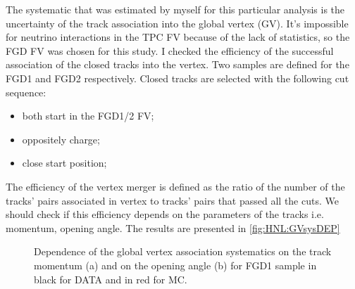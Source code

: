 \documentclass[../main.tex]{subfiles}
\begin{document}
The systematic that was estimated by myself for this particular analysis is the uncertainty of the track association into the global vertex (GV). It's impossible for neutrino interactions in the TPC FV because of the lack of statistics, so the FGD FV was chosen for this study. I checked the efficiency of the successful association of the closed tracks into the vertex. Two samples are defined for the FGD1 and FGD2 respectively. Closed tracks are selected with the following cut sequence:
\begin{itemize}
    \item both start in the FGD1/2 FV;
    \item oppositely charge;
    \item close start position;
\end{itemize}
The efficiency of the vertex merger is defined as the ratio of the number of the tracks' pairs associated in vertex to tracks' pairs that passed all the cuts. We should check if this efficiency depends on the parameters of the tracks i.e. momentum, opening angle. The results are presented in \autoref{fig:HNL:GVsysDEP}
\begin{figure}[!ht]
    \begin{minipage}[h]{0.49\linewidth}
    \end{minipage}
    \hfill
    \begin{minipage}[h]{0.49\linewidth}
    \end{minipage}
    \vfill
    \begin{minipage}[h]{0.49\linewidth}
    \end{minipage}
    \hfill
    \begin{minipage}[h]{0.49\linewidth}
    \end{minipage}
    \caption{Dependence of the global vertex association systematics on the  track momentum (a) and on the opening angle (b) for FGD1 sample in black for DATA and in red for MC.}
    \label{fig:HNL:GVsysDEP}
\end{figure}
\end{document}
